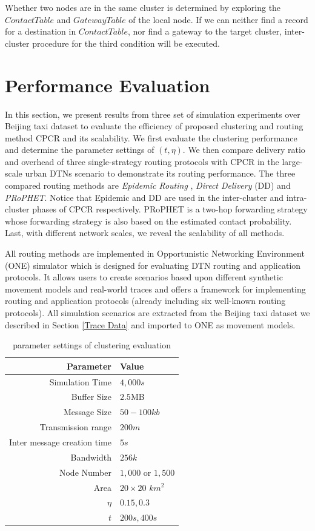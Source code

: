 \documentclass[conference]{IEEEtran}
\begin{document}
Whether two nodes are in the same cluster is determined by exploring the $ContactTable$ and $GatewayTable$ of the local node. If we can neither find a record for a destination in $ContactTable$, nor find a gateway to the target cluster, inter-cluster procedure for the third condition will be executed.

\section{Performance Evaluation}
\label{Section6_simulation}

In this section, we present results from three set of simulation experiments over Beijing taxi dataset to evaluate the efficiency of proposed clustering and routing method CPCR and its scalability. We first evaluate the clustering performance and determine the parameter settings of $(t, \eta)$. We then compare delivery ratio and overhead of three single-strategy routing protocols with CPCR in the large-scale urban DTNs scenario to demonstrate its routing performance. The three compared routing methods are \emph{Epidemic Routing} \cite{VahdatBecker-779}, \emph{Direct Delivery} (DD) \cite{BalasubramanianLevine-489} and \emph{PRoPHET}. Notice that  Epidemic and DD are used in the inter-cluster and intra-cluster phases of CPCR respectively.  PRoPHET is a two-hop forwarding strategy whose forwarding strategy is also based on the estimated contact probability. Last, with different network scales, we reveal the scalability of all methods.

All routing methods are implemented in Opportunistic Networking Environment (ONE)\cite{KeranenOtt-155} simulator which is designed for evaluating DTN routing and application protocols. It allows users to create scenarios based upon different synthetic movement models and real-world traces and offers a framework for implementing routing and application protocols (already including six well-known routing protocols). All simulation scenarios are extracted from the Beijing taxi dataset we described in Section \ref{Trace Data} and imported to ONE as movement models.
\begin{table}[!t]
  \centering
  \caption{parameter settings of clustering evaluation}\label{table_label_parameter_settings}
  \vspace{.1in}
  \begin{tabular}[c]{r|l}
  \hline
  Parameter & Value \\
  \hline
  Simulation Time & $4,000s$\\
  Buffer Size & $2.5$MB \\
  Message Size & $50-100kb$\\
  Transmission range & $200m$ \\
  Inter message creation time & $5s$\\
  Bandwidth & $256k$ \\
  Node Number & $1,000$ or $1,500$ \\
  Area & $20\times 20$ $km^{2}$ \\
  $\eta$ & $0.15,0.3$ \\
  $t$ & $200s,400s$ \\
  \hline
  \end{tabular}
\end{table}
\end{document}

